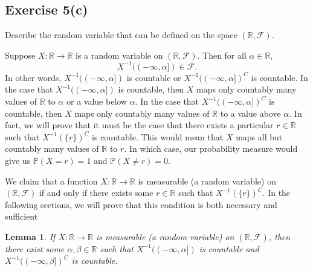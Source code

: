 \documentclass[12pt]{article}
\newtheorem{lemma}{Lemma}
\newenvironment{problem}
    {\begin{lrbox}{\mybox}\begin{minipage}{\textwidth-10pt}}
    {\end{minipage}\end{lrbox}\framebox[\textwidth]{\usebox{\mybox}}}
\newcommand{\R}{\mathbb{R}}
\newcommand{\FF}{\mathcal{F}}
\renewcommand{\P}{\mathbb{P}}
\begin{document}
\subsection*{Exercise 5(c)}
\begin{problem}
    Describe the random variable that can be defined on the space $(\R, \FF)$.
\end{problem}
\medskip

Suppose $X:\R\to\R$ is a random variable on $(\R,\FF)$. Then for all $\alpha\in\R$,
\[X^{-1}((-\infty,\alpha]) \in \FF.\]
In other words, $X^{-1}((-\infty,\alpha])$ is countable or $X^{-1}((-\infty,\alpha])^C$ is countable. In the case that $X^{-1}((-\infty,\alpha])$ is countable, then $X$ maps only countably many values of $\R$ to $\alpha$ or a value below $\alpha$. In the case that $X^{-1}((-\infty,\alpha])^C$ is countable, then $X$ maps only countably many values of $\R$ to a value above $\alpha$. In fact, we will prove that it must be the case that there exists a particular $r\in\R$ such that $X^{-1}(\{r\})^C$ is countable. This would mean that $X$ maps all but countably many values of $\R$ to $r$. In which case, our probability measure would give us $\P(X=r) = 1$ and $\P(X\ne r) = 0$.

We claim that a function $X:\R\to\R$ is measurable (a random variable) on $(\R,\FF)$ if and only if there exists some $r\in\R$ such that $X^{-1}(\{r\})^C$. In the following sections, we will prove that this condition is both necessary and sufficient 

\begin{lemma}
    If $X:\R\to\R$ is measurable (a random variable) on $(\R,\FF)$, then there exist some $\alpha,\beta\in\R$ such that $X^{-1}((-\infty,\alpha])$ is countable and $X^{-1}((-\infty,\beta])^C$ is countable.
\end{lemma}
\end{document}
